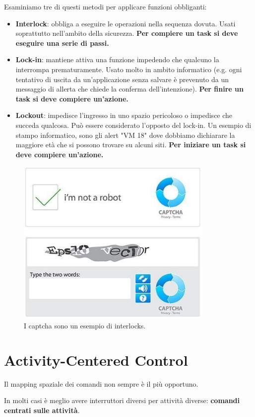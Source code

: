 \documentclass[a4paper,11pt,oneside]{book}
\begin{document}
Esaminiamo tre di questi metodi per applicare funzioni obbliganti:
\begin{itemize}
	\item \textbf{Interlock}: obbliga a eseguire le operazioni nella sequenza dovuta. Usati soprattutto nell'ambito della sicurezza. \textbf{Per compiere un task si deve eseguire una serie di passi.}
	\item \textbf{Lock-in}: mantiene attiva una funzione impedendo che qualcuno la interrompa prematuramente. Usato molto in ambito informatico (e.g. ogni tentativo di uscita da un'applicazione senza salvare è prevenuto da un messaggio di allerta che chiede la conferma dell'intenzione). \textbf{Per finire un task si deve compiere un'azione.}
	\item \textbf{Lockout}: impedisce l'ingresso in uno spazio pericoloso o impedisce che succeda qualcosa. Può essere considerato l'opposto del lock-in. Un esempio di stampo informatico, sono gli alert "VM 18" dove dobbiamo dichiarare la maggiore età che si possono trovare su alcuni siti. \textbf{Per iniziare un task si deve compiere un'azione.}
\end{itemize}

\begin{figure}[!h]
	\centering
	\includegraphics[scale=0.4]{immagini/cap.png}
	\caption{I captcha sono un esempio di interlocks.}
\end{figure}

\section{Activity-Centered Control}
Il mapping spaziale dei comandi non sempre è il più opportuno.

In molti casi è meglio avere interruttori diversi per attività diverse: \textbf{comandi centrati sulle attività}.
\end{document}

